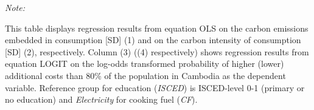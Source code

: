\begin{table}[htbp!]
\begin{adjustbox}{width = 1\textwidth, max height = 0.95\textheight, center}
\begin{threeparttable}[b]
         \begin{tablenotes}\item \medskip \textit{Note:}
            \item This table displays regression results from equation OLS on the carbon emissions embedded in consumption [SD] (1) and on the carbon intensity of consumption [SD] (2), respectively. 
                                      Column (3) ((4) respectively) shows regression results from equation LOGIT on the log-odds transformed probability of higher (lower) additional costs than 80\% of the population in Cambodia as the dependent variable. Reference group for education (\textit{ISCED}) is ISCED-level 0-1 (primary or no education) and \textit{Electricity} for cooking fuel (\textit{CF}).
         \end{tablenotes}
      \end{threeparttable}
   \end{adjustbox}
\end{table}


